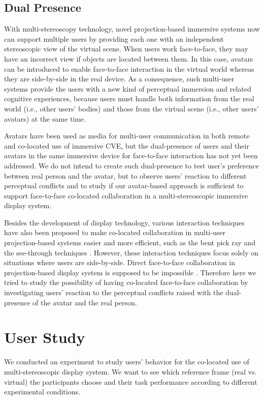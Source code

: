 \subsection{Dual Presence}
With multi-stereoscopy technology, novel projection-based immersive systems now can support multiple users by providing each one with an independent stereoscopic view of the virtual scene. When users work face-to-face, they may have an incorrect view if objects are located between them. In this case, avatars can be introduced to enable face-to-face interaction in the virtual world whereas they are side-by-side in the real device. As a consequence, such multi-user systems provide the users with a new kind of perceptual immersion and related cognitive experiences, because users must handle both information from the real world (i.e., other users' bodies) and those from the virtual scene (i.e., other users' avatars) at the same time.

Avatars have been used as media for multi-user communication in both remote and co-located use of immersive CVE, but the dual-presence of users and their avatars in the same immersive device for face-to-face interaction has not yet been addressed. We do not intend to create such dual-presence to test user's preference between real person and the avatar, but to observe users' reaction to different perceptual conflicts and to study if our avatar-based approach is sufficient to support face-to-face co-located collaboration in a multi-stereoscopic immersive display system.

Besides the development of display technology, various interaction techniques have also been proposed to make co-located collaboration in multi-user projection-based systems easier and more efficient, such as the bent pick ray \citep{Riege2006Bent} and the see-through techniques \citep{Argelaguet2010STT}. However, these interaction techniques focus solely on situations where users are side-by-side. Direct face-to-face collaboration in projection-based display system is supposed to be impossible \citep{Salzmann2009CIC}. Therefore here we tried to study the possibility of having co-located face-to-face collaboration by investigating users' reaction to the perceptual conflicts raised with the dual-presence of the avatar and the real person.


\section{User Study}
We conducted an experiment to study users' behavior for the co-located use of multi-stereoscopic display system. We want to see which reference frame (real vs. virtual) the participants choose and their task performance according to different experimental conditions.

